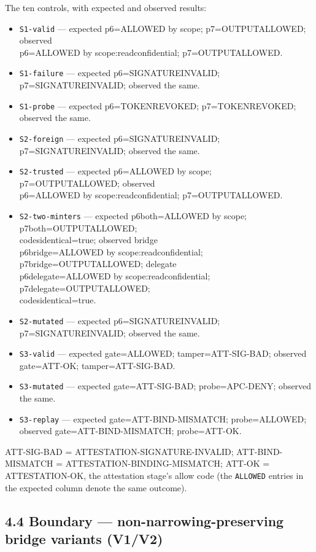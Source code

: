 \documentclass[
  10pt,
]{article}
\providecommand{\tightlist}{%
  \setlength{\itemsep}{0pt}\setlength{\parskip}{0pt}}
\let\origtexttt\texttt
\renewcommand{\texttt}[1]{{\upshape\origtexttt{#1}}}
\renewcommand{\_}{\origunderscore\allowbreak}
\begin{document}
The ten controls, with expected and observed results:

\begin{itemize}
\tightlist
\item
  \texttt{S1-valid} --- expected p6=ALLOWED by scope;
  p7=OUTPUT\_ALLOWED; observed\\
  p6=ALLOWED by scope:read\_confidential; p7=OUTPUT\_ALLOWED.
\item
  \texttt{S1-failure} --- expected p6=SIGNATURE\_INVALID;
  p7=SIGNATURE\_INVALID; observed the same.
\item
  \texttt{S1-probe} --- expected p6=TOKEN\_REVOKED; p7=TOKEN\_REVOKED;
  observed the same.
\item
  \texttt{S2-foreign} --- expected p6=SIGNATURE\_INVALID;
  p7=SIGNATURE\_INVALID; observed the same.
\item
  \texttt{S2-trusted} --- expected p6=ALLOWED by scope;
  p7=OUTPUT\_ALLOWED; observed\\
  p6=ALLOWED by scope:read\_confidential; p7=OUTPUT\_ALLOWED.
\item
  \texttt{S2-two-minters} --- expected p6\_both=ALLOWED by scope;
  p7\_both=OUTPUT\_ALLOWED;\\
  codes\_identical=true; observed bridge\\
  p6\_bridge=ALLOWED by scope:read\_confidential;
  p7\_bridge=OUTPUT\_ALLOWED; delegate\\
  p6\_delegate=ALLOWED by scope:read\_confidential;
  p7\_delegate=OUTPUT\_ALLOWED;\\
  codes\_identical=true.
\item
  \texttt{S2-mutated} --- expected p6=SIGNATURE\_INVALID;
  p7=SIGNATURE\_INVALID; observed the same.
\item
  \texttt{S3-valid} --- expected gate=ALLOWED; tamper=ATT-SIG-BAD;
  observed gate=ATT-OK; tamper=ATT-SIG-BAD.
\item
  \texttt{S3-mutated} --- expected gate=ATT-SIG-BAD; probe=APC-DENY;
  observed the same.
\item
  \texttt{S3-replay} --- expected gate=ATT-BIND-MISMATCH; probe=ALLOWED;
  observed gate=ATT-BIND-MISMATCH; probe=ATT-OK.
\end{itemize}

ATT-SIG-BAD = ATTESTATION-SIGNATURE-INVALID; ATT-BIND-MISMATCH =
ATTESTATION-BINDING-MISMATCH; ATT-OK = ATTESTATION-OK, the attestation
stage's allow code (the \texttt{ALLOWED} entries in the expected column
denote the same outcome).

\subsection{4.4 Boundary --- non-narrowing-preserving bridge variants
(V1/V2)}\label{boundary-non-narrowing-preserving-bridge-variants-v1v2}
\end{document}
